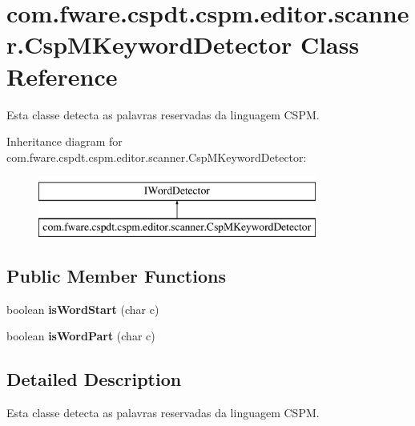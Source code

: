 \hypertarget{classcom_1_1fware_1_1cspdt_1_1cspm_1_1editor_1_1scanner_1_1_csp_m_keyword_detector}{}\section{com.\+fware.\+cspdt.\+cspm.\+editor.\+scanner.\+Csp\+M\+Keyword\+Detector Class Reference}
\label{classcom_1_1fware_1_1cspdt_1_1cspm_1_1editor_1_1scanner_1_1_csp_m_keyword_detector}


Esta classe detecta as palavras reservadas da linguagem C\+S\+PM.  


Inheritance diagram for com.\+fware.\+cspdt.\+cspm.\+editor.\+scanner.\+Csp\+M\+Keyword\+Detector\+:\begin{figure}[H]
\begin{center}
\leavevmode
\includegraphics[height=2.000000cm]{classcom_1_1fware_1_1cspdt_1_1cspm_1_1editor_1_1scanner_1_1_csp_m_keyword_detector}
\end{center}
\end{figure}
\subsection*{Public Member Functions}
\begin{DoxyCompactItemize}
\item 
\mbox{\label{classcom_1_1fware_1_1cspdt_1_1cspm_1_1editor_1_1scanner_1_1_csp_m_keyword_detector_aa3380cc5a555c57733a24984b4ba9420}} 
boolean {\bfseries is\+Word\+Start} (char c)
\item 
\mbox{\label{classcom_1_1fware_1_1cspdt_1_1cspm_1_1editor_1_1scanner_1_1_csp_m_keyword_detector_a6768b7b8f349bcc5dbc542661c88370b}} 
boolean {\bfseries is\+Word\+Part} (char c)
\end{DoxyCompactItemize}


\subsection{Detailed Description}
Esta classe detecta as palavras reservadas da linguagem C\+S\+PM. 


